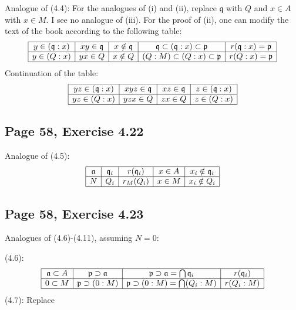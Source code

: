 \documentclass[parskip=half,fontsize=12pt]{scrartcl}%
\newcommand{\mf}{\mathfrak}
\newcommand{\aaa}{\mf a}
\newcommand{\ppp}{\mf p}
\newcommand{\qqq}{\mf q}
\begin{document}
Analogue of (4.4): For the analogues of (i) and (ii), replace $\qqq$ with $Q$ and $x\in A$ with $x\in M$. I see no analogue of (iii). For the proof of (ii), one can modify the text of the book according to the following table:  
$$
\begin{array}{|c|c|c|c|c|}\hline
y\in(\qqq:x)&xy\in\qqq&x\notin\qqq&\qqq\subset(\qqq:x)\subset\ppp&r(\qqq:x)=\ppp\\ \hline
y\in(Q:x)&yx\in Q&x\notin Q&(Q:M)\subset(Q:x)\subset\ppp&r(Q:x)=\ppp\\ \hline
\end{array}
$$ 
Continuation of the table:
$$
\begin{array}{|c|c|c|c|}\hline
yz\in(\qqq:x)&xyz\in\qqq&xz\in\qqq&z\in(\qqq:x)\\ \hline
yz\in(Q:x)&yzx\in Q&zx\in Q&z\in(Q:x)\\ \hline
\end{array}
$$ 

\subsection{Page 58, Exercise 4.22}%

Analogue of (4.5): 
$$
\begin{array}{|c|c|c|c|c|}\hline
\aaa&\qqq_i&r(\qqq_i)&x\in A&x_i\notin\qqq_i\\ \hline 
N&Q_i&r_M(Q_i)&x\in M&x_i\notin Q_i\\ \hline
\end{array}
$$ 

\subsection{Page 58, Exercise 4.23}%

Analogues of (4.6)-(4.11), assuming $N=0$: 

(4.6):
$$
\begin{array}{|c|c|c|c|}\hline
\aaa\subset A&\ppp\supset\aaa&\ppp\supset\aaa=\bigcap\qqq_i&r(\qqq_i)\\ \hline 
0\subset M&\ppp\supset(0:M)&\ppp\supset(0:M)=\bigcap(Q_i:M)&r(Q_i:M)\\ \hline
\end{array}
$$ 
(4.7): Replace 
\end{document}
